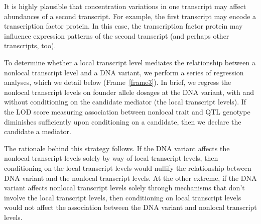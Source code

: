\documentclass[oneside]{book}\usepackage[]{graphicx}\usepackage[]{color}
\begin{document}
It is highly plausible that concentration variations in one transcript may 
affect abundances of a second transcript. 
For example, the first transcript may encode a transcription factor protein. 
In this case, the transcription factor protein may influence expression 
patterns of the second transcript (and perhaps other transcripts, too). 


To determine whether a local transcript level mediates the relationship between 
a nonlocal transcript level and a DNA variant, we perform a series of regression analyses, 
which we detail below (Frame~\ref{frame3}). 
In brief, we regress the nonlocal transcript levels on founder allele dosages at the DNA 
variant, with and without conditioning on the candidate mediator (the local transcript levels). 
If the LOD score measuring association between nonlocal trait and QTL genotype diminishes sufficiently upon conditioning on a candidate, 
then we declare the candidate a mediator.

The rationale behind this strategy follows. 
If the DNA variant affects the nonlocal transcript levels solely by way of local 
transcript levels, then conditioning on the local transcript levels would nullify the relationship between DNA variant and the nonlocal transcript levels. 
At the other extreme, if the DNA variant affects nonlocal transcript levels solely 
through mechanisms that don't involve the local transcript levels, then conditioning 
on local transcript levels would not affect the association between the DNA variant and nonlocal transcript levels.


\end{document}

